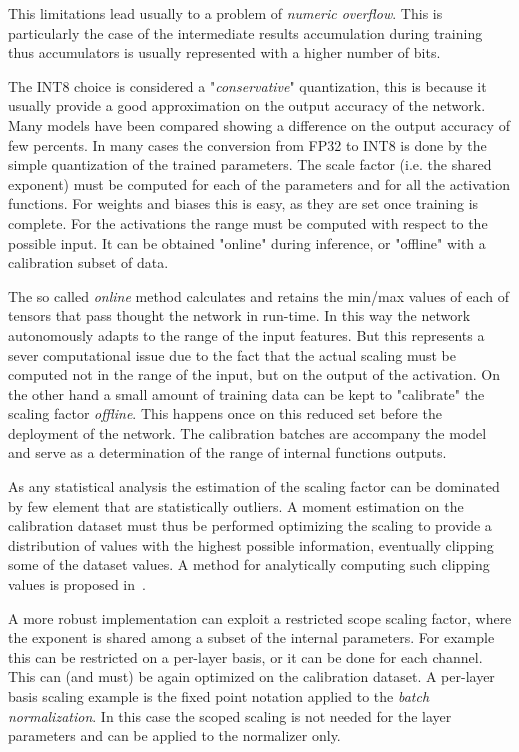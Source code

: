 This limitations lead usually to a problem of \textit{numeric overflow}. This is particularly the case of the intermediate results accumulation during training~\cite{courbariaux2014training} thus accumulators is usually represented with a higher number of bits.

The INT8 choice is considered a "\textit{conservative}" quantization, this is because it usually provide a good approximation on the output accuracy of the network. Many models have been compared showing a difference on the output accuracy of few percents. In many cases the conversion from FP32 to INT8 is done by the simple quantization of the trained parameters. The scale factor (i.e. the shared exponent) must be computed for each of the parameters and for all the activation functions.
For weights and biases this is easy, as they are set once training is complete. For the activations the range must be computed with respect to the possible input. It can be obtained "online" during inference, or "offline" with a calibration subset of data.

The so called \textit{online} method calculates and retains the min/max values of each of tensors that pass thought the network in run-time. In this way the network autonomously adapts to the range of the input features. 
But this represents a sever computational issue due to the fact that the actual scaling must be computed not in the range of the input, but on the output of the activation.
On the other hand a small amount of training data can be kept to "calibrate" the scaling factor \textit{offline}. This happens once on this reduced set before the deployment of the network. The calibration batches are accompany the model and serve as a determination of the range of internal functions outputs.

As any statistical analysis the estimation of the scaling factor can be dominated by few element that are statistically outliers. A moment estimation on the calibration dataset must thus be performed optimizing the scaling to provide a distribution of values with the highest possible information, eventually clipping some of the dataset values.
A method for analytically computing such clipping values is proposed in~\cite{banner2018posttraining}.

A more robust implementation can exploit a restricted scope scaling factor, where the exponent is shared among a subset of the internal parameters. For example this can be restricted on a per-layer basis, or it can be done for each channel. This can (and must) be again optimized on the calibration dataset. 
A per-layer basis scaling example is the fixed point notation applied to the \textit{batch normalization}. In this case the scoped scaling is not needed for the layer parameters and can be applied to the normalizer only.

